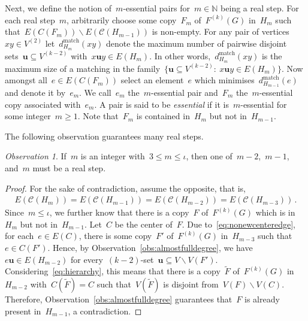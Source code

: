 \documentclass[oneside, 12pt]{amsart}
\numberwithin{equation}{section}
\numberwithin{figure}{section}
\let\setminus=\smallsetminus
\newcommand{\cC}{\mathcal{C}}
\theoremstyle{plain}
\theoremstyle{note}
\theoremstyle{remark}
\newtheorem{observation}[theorem]{Observation}
\begin{document}
	Next, we define the notion of~$m$-essential pairs for~$m\in\mathds{N}$ being a real step.
	For each real step~$m$, arbitrarily choose some copy~$F_m$ of~$F^{(k)}(G)$ in~$H_m$ such that~$E(C(F_m))\setminus E(\cC(H_{m-1}))$ is non-empty.
	For any pair of vertices~$xy\in V^{(2)}$ let~$d^{\text{match}}_{H_m}(xy)$ denote the maximum number of pairwise disjoint sets~$\mathbf{u}\subseteq V^{(k-2)}$ with~$x\mathbf{u}y\in E(H_m)$.
	In other words,~$d^{\text{match}}_{H_m}(xy)$ is the maximum size of a matching in the family~$\{\mathbf{u}\subseteq V^{(k-2)}:\:x\mathbf{u}y\in E(H_m)\}$.
	Now amongst all~$e\in E(C(F_m))$ select an element~$e$ which minimises~$d^{\text{match}}_{H_{m-1}}(e)$ and denote it by~$e_m$.
	We call~$e_m$ the~$m$-essential pair and~$F_m$ the~$m$-essential copy associated with~$e_m$.
	A pair is said to be \emph{essential} if it is~$m$-essential for
	some integer~$m \ge 1$.
	Note that~$F_m$ is contained in~$H_m$ but not in~$H_{m-1}$.
	
	The following observation guarantees many real steps.
	
	\begin{observation}\label{obs:1/3realstep}
		If~$m$ is an integer with~$3\leq m\leq\iota$, then one of~$m-2$,~$m-1$, and~$m$ must be a real step.
	\end{observation}
	
	\begin{proof}
		For the sake of contradiction, assume the opposite, that is,
		\begin{align}\label{eq:nonewcenteredge}
			E(\cC(H_m))=E(\cC(H_{m-1}))=E(\cC(H_{m-2}))=E(\cC(H_{m-3}))\,.
		\end{align}
		Since~$m\leq\iota$, we further know that there is a copy~$F$ of~$F^{(k)}(G)$ which is in~$H_m$ but not in~$H_{m-1}$.
		Let~$C$ be the center of~$F$.
		Due to~\eqref{eq:nonewcenteredge}, for each~$e\in E(C)$, there is some copy~$F'$ of~$F^{(k)}(G)$ in~$H_{m-3}$ such that~$e\in C(F')$.
        Hence, by Observation~\ref{obs:almostfulldegree}, we have~$e\mathbf{u}\in E(H_{m-2})$ for every~$(k-2)$-set~$\mathbf{u}\subseteq V\setminus V(F')$.
        Considering~\eqref{eq:hierarchy}, this means that there is a copy~$\widetilde{F}$ of~$F^{(k)}(G)$ in~$H_{m-2}$ with~$C(\widetilde{F})=C$ such that~$V(\widetilde{F})$ is disjoint from~$V(F)\setminus V(C)$.
		Therefore, Observation~\ref{obs:almostfulldegree} guarantees that~$F$ is already present in~$H_{m-1}$, a contradiction.
	\end{proof}
	
\end{document}
